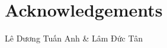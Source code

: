 \chapter{Acknowledgements}


\begin{flushright}
\begin{minipage}{8cm}
\centering

\begin{otherlanguage}{vietnamese}
Lê Dương Tuấn Anh \& Lâm Đức Tân
\end{otherlanguage}
\end{minipage}
\end{flushright}